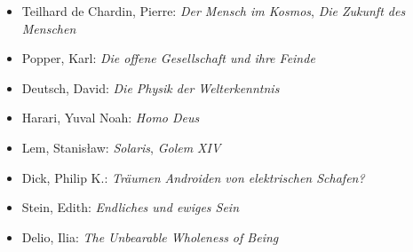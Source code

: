 \documentclass[
]{article}
\begin{document}
\begin{itemize}
\item Teilhard de Chardin, Pierre: \emph{Der Mensch im Kosmos}, \emph{Die Zukunft des Menschen}
\item Popper, Karl: \emph{Die offene Gesellschaft und ihre Feinde}
\item Deutsch, David: \emph{Die Physik der Welterkenntnis}
\item Harari, Yuval Noah: \emph{Homo Deus}
\item Lem, Stanisław: \emph{Solaris}, \emph{Golem XIV}
\item Dick, Philip K.: \emph{Träumen Androiden von elektrischen Schafen?}
\item Stein, Edith: \emph{Endliches und ewiges Sein}
\item Delio, Ilia: \emph{The Unbearable Wholeness of Being}
\end{itemize}
\end{document}
